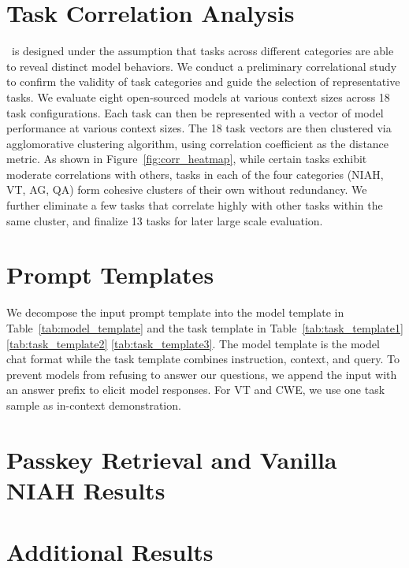 

\clearpage
\section{Task Correlation Analysis}
\label{task_correlation}
 ~is designed under the assumption that tasks across different categories are able to reveal distinct model behaviors. We conduct a preliminary correlational study to confirm the validity of task categories and guide the selection of representative tasks. We evaluate eight open-sourced models at various context sizes across 18 task configurations. Each task can then be represented with a vector of model performance at various context sizes. The 18 task vectors are then clustered via agglomorative clustering algorithm, using correlation coefficient as the distance metric.
 As shown in Figure~\ref{fig:corr_heatmap}, while certain tasks exhibit moderate correlations with others, tasks in each of the four categories (NIAH, VT, AG, QA) form cohesive clusters of their own without redundancy. We further eliminate a few tasks that correlate highly with other tasks within the same cluster, and finalize 13 tasks for later large scale evaluation.


\clearpage
\section{Prompt Templates}
\label{prompt_templates}
We decompose the input prompt template into the model template in Table~\ref{tab:model_template} and the task template in Table~\ref{tab:task_template1} \ref{tab:task_template2} \ref{tab:task_template3}. The model template is the model chat format while the task template combines instruction, context, and query. To prevent models from refusing to answer our questions, we append the input with an answer prefix to elicit model responses. For VT and CWE, we use one task sample as in-context demonstration.


\clearpage


\clearpage
\section{Passkey Retrieval and Vanilla NIAH Results}
\label{perfect_results}
% 


\clearpage
\section{Additional Results}
\label{additional_results}


\clearpage


\clearpage




